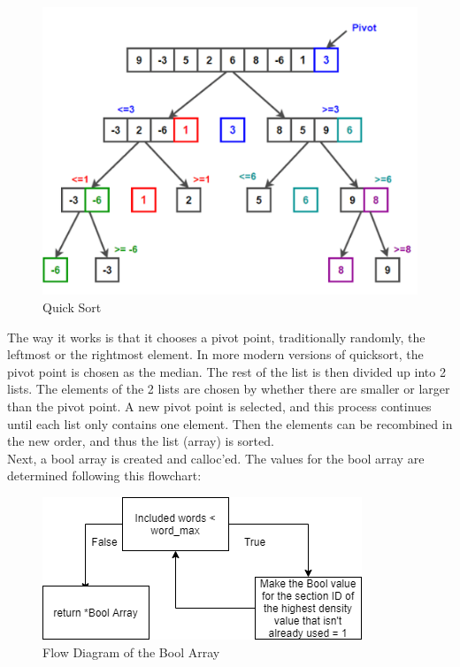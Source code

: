 \begin{figure}[H]
  \centering
  \includegraphics[scale = 0.7]{figures/qsort.png}
  \caption{Quick Sort \cite{quicksort}}
\end{figure}
The way it works is that it chooses a pivot point, traditionally randomly, the leftmost or the rightmost element.
In more modern versions of quicksort, the pivot point is chosen as the median. The rest of the list is then divided up into 2 lists.
The elements of the 2 lists are chosen by whether there are smaller or larger than the pivot point.
A new pivot point is selected, and this process continues until each list only contains one element. 
Then the elements can be recombined in the new order, and thus the list (array) is sorted.
\\
Next, a bool array is created and calloc'ed. The values for the bool array are determined following this flowchart:
\begin{figure}[H]
  \centering
  \includegraphics[scale = 0.6]{figures/include_flow.png}
  \caption{Flow Diagram of the Bool Array}
\end{figure} 
